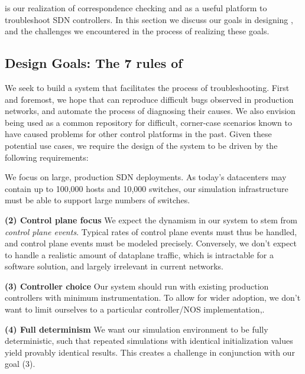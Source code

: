 
\projectname{} is our realization of correspondence checking and \simulator{}
as a useful platform to troubleshoot SDN controllers. In this section we discuss
our goals in designing \simulator{}, and the challenges we encountered in the process
of realizing these goals.

\subsection{Design Goals: The 7 rules of \projectname{}}

We seek to build a system that facilitates the process of troubleshooting.
First and foremost, we hope that \projectname{} can reproduce difficult bugs
observed in production networks, and automate the process of diagnosing their
causes. We also envision \projectname{} being used as a common repository for difficult, corner-case
scenarios known to have caused problems for other control platforms in the past.
Given these potential use cases, we require the design of the system to be
driven by the following requirements:

 We focus on large, production SDN
deployments. As today's datacenters may contain up to 100,000 hosts and 10,000
switches, our simulation infrastructure must be able to support large numbers
of switches. 

\noindent \textbf{(2) Control plane focus} We expect the dynamism in our system to stem from
\emph{control plane events}. Typical rates of control plane events must thus be
handled, and control plane events must be modeled precisely. Conversely, we
don't expect to handle a realistic amount of dataplane traffic, which is
intractable for a software solution, and largely irrelevant in current networks.

\noindent \textbf{(3) Controller choice} Our system should run with existing production
controllers with minimum instrumentation. To allow for wider adoption, we don't want to limit ourselves to
a particular controller/NOS implementation,.

\noindent \textbf{(4) Full determinism} We want our simulation environment to be fully 
deterministic, such that repeated simulations with identical initialization values
yield provably identical results. This creates a challenge in conjunction with our goal (3).


